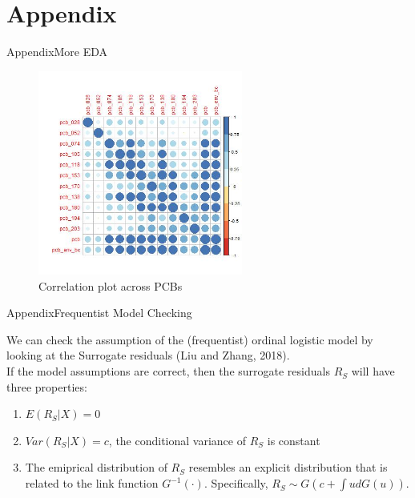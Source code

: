 \documentclass{beamer}
\begin{document}
\section{Appendix}
\begin{frame}{Appendix}{More EDA}
\begin{figure}
\centering
\includegraphics[width=0.6\textwidth]{pcb_corr.jpeg}
\caption{Correlation plot across PCBs}
\label{fig:corrPCB}
\end{figure}
\end{frame}
\begin{frame}{Appendix}{Frequentist Model Checking}

We can check the assumption of the (frequentist) ordinal logistic model by looking at the Surrogate residuals (Liu and Zhang, 2018).\\

\medskip
If the model assumptions are correct, then the surrogate residuals $R_S$ will have three properties:
\begin{enumerate}
\item $E(R_S|X)=0$
\item $Var(R_S|X)=c$, the conditional variance of $R_S$ is constant
\item The emiprical distribution of $R_S$ resembles an explicit distribution that is related to the link function $G^{-1}(\cdot)$. Specifically, $R_S\sim G(c+\int ud G(u))$.
\end{enumerate}
\end{frame}
\end{document}
